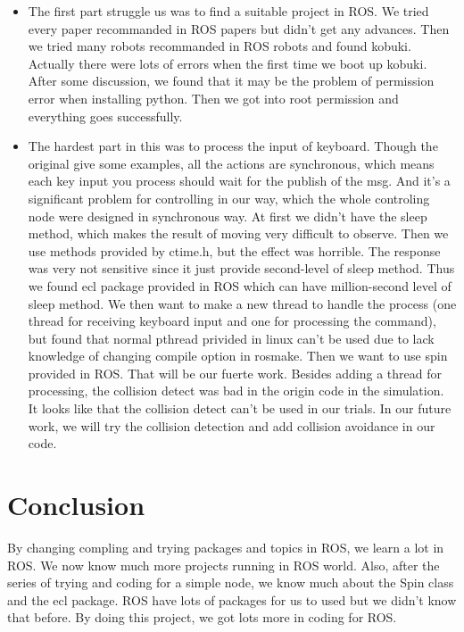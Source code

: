 \documentclass[preprint,pre,floats,aps,amsmath,amssymb]{revtex4}
\begin{document}
\begin{itemize}
\item The first part struggle us was to find a suitable project in ROS. We tried every paper recommanded in ROS papers but didn't get any advances. Then we tried many robots recommanded in ROS robots and found kobuki. Actually there were lots of errors when the first time we boot up kobuki. After some discussion, we found that it may be the problem of permission error when installing python. Then we got into root permission and everything goes successfully.

\item The hardest part in this was to process the input of keyboard. Though the original give some examples, all the actions are synchronous, which means each key input you process should wait for the publish of the msg. And it's a significant problem for controlling in our way, which the whole controling node were designed in synchronous way. At first we didn't have the sleep method, which makes the result of moving very difficult to observe. Then we use methods provided by ctime.h, but the effect was horrible. The response was very not sensitive since it just provide second-level of sleep method. Thus we found ecl package provided in ROS which can have million-second level of sleep method. We then want to make a new thread to handle the process (one thread for receiving keyboard input and one for processing the command), but found that normal pthread privided in linux can't be used due to lack knowledge of changing compile option in rosmake. Then we want to use spin provided in ROS. That will be our fuerte work. Besides adding a thread for processing, the collision detect was bad in the origin code in the simulation. It looks like that the collision detect can't be used in our trials. In our future work, we will try the collision detection and add collision avoidance in our code.

\end{itemize}

\section{Conclusion}
\label{sec:conclusion}

By changing compling and trying packages and topics in ROS, we learn a lot in ROS. We now know much more projects running in ROS world. Also, after the series of trying and coding for a simple node, we know much about the Spin class and the ecl package. ROS have lots of packages for us to used but we didn't know that before. By doing this project, we got lots more in coding for ROS.
\end{document}
